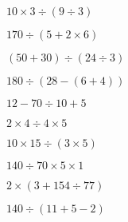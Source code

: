 \documentclass{exam}
\begin{document}
\item $10 \times 3 \div \left(9 \div 3\right)$
\item $170 \div \left(5 + 2 \times 6\right)$
\item $\left(50 + 30\right) \div \left(24 \div 3\right)$
\item $180 \div \left(28 - \left(6 + 4\right)\right)$
\item $12 - 70 \div 10 + 5$
\item $2 \times 4 \div 4 \times 5$
\item $10 \times 15 \div \left(3 \times 5\right)$
\item $140 \div 70 \times 5 \times 1$
\item $2 \times \left(3 + 154 \div 77\right)$
\item $140 \div \left(11 + 5 - 2\right)$
\end{document}
